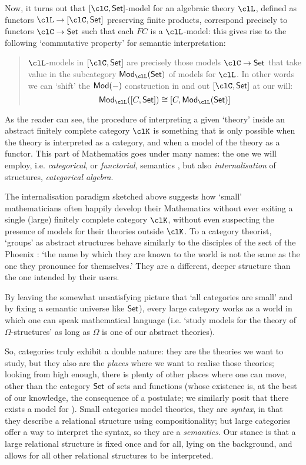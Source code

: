 Now, it turns out that $[\clC,\Set]$-model for an algebraic theory $\clL$, defined as functors $\clL \to [\clC,\Set]$ preserving finite products, correspond precisely to functors $\clC\to \Set$ such that each $FC$ is a $\clL$-model: this gives rise to the following `commutative property' for semantic interpretation:
\begin{quote}
    $\clL$-models in $[\clC,\Set]$ are precisely those models $\clC \to \Set$ that take value in the subcategory $\cate{Mod}_{\clL}(\Set)$ of models for $\clL$. In other words we can `shift' the $\mathsf{Mod}(-)$ construction in and out $[\clC,\Set]$ at our will:
    \[
        \cate{Mod}_{\clL}([C,\Set]) \cong [C, \cate{Mod}_{\clL}(\Set)]
    \]
\end{quote}
As the reader can see, the procedure of interpreting a given `theory' inside an abstract finitely complete category $\clK$ is something that is only possible when the theory is interpreted as a category, and when a model of the theory as a functor. This part of Mathematics goes under many names: the one we will employ, i.e. \emph{categorical}, or \emph{functorial}, semantics \cite{lawvere1963functorial}, but also \emph{internalisation} of structures, \emph{categorical algebra}.

The internalisation paradigm sketched above suggests how `small' mathematicians often happily develop their Mathematics without ever exiting a single (large) finitely complete category $\clK$, without even suspecting the presence of models for their theories outside $\clK$. To a category theorist, `groups' as abstract structures behave similarly to the disciples of the sect of the Phoenix \cite{fenix}: `the name by which they are known to the world is not the same as the one they pronounce for themselves.' They are a different, deeper structure than the one intended by their users.

By leaving the somewhat unsatisfying picture that `all categories are small' and by fixing a semantic universe like $\mathsf{Set}$), every large category works as a world in which one can speak mathematical language (i.e. `study models for the theory of $\Omega$-structures' as long as $\Omega$ is one of our abstract theories).

So, categories truly exhibit a double nature: they are the theories we want to study, but they also are the \emph{places} where we want to realise those theories; looking from high enough, there is plenty of other places where one can move, other than the category $\mathsf{Set}$ of sets and functions (whose existence is, at the best of our knowledge, the consequence of a postulate; we similarly posit that there exists a model for ). Small categories model theories, they are \emph{syntax}, in that they describe a relational structure using compositionality; but large categories offer a way to interpret the syntax, so they are a \emph{semantics}. Our stance is that a large relational structure is fixed once and for all, lying on the background, and allows for all other relational structures to be interpreted.

